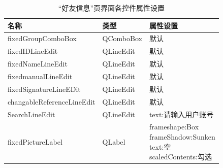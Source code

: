 \documentclass{progartcn}
\begin{document}
\begin{table}[H]
	\renewcommand{\arraystretch}{1.0}
	\centering
	\caption{\centering “好友信息”页界面各控件属性设置}
	\begin{tabular}{lll}
		\toprule[1.5pt]
		名称                   & 类型          & 属性设置                                                                                                                                                                  \\
		\midrule[1pt]
fixedGroupComboBox         & QComboBox   & 默认                                                                                                                                                                    \\
fixedIDLineEdit            & QLineEdit   & 默认                                                                                                                                                                    \\
fixedNameLineEdit          & QLineEdit   & 默认                                                                                                                                                                    \\
fixedmanualLineEdit        & QLineEdit   & 默认                                                                                                                                                                    \\
fixedSignatureLineEDit     & QLineEdit   & 默认                                                                                                                                                                    \\
changableReferenceLineEdit & QLineEdit   & 默认                                                                                                                                                                    \\
SearchLineEdit             & QLineEdit   & text:请输入用户账号                                                                                                                                                          \\
fixedPictureLabel          & QLabel      & \makecell[l]{frameshape:Box\\ frameShadow:Sunken\\ text:空\\ scaledContents:勾选}                                                                                                            \\

\end{tabular}
\end{table}
\end{document}

